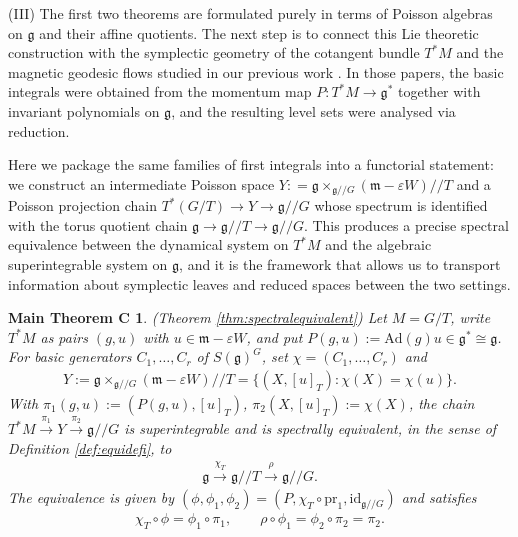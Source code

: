 \documentclass[11pt,reqno]{amsart}
\newtheorem*{theorem A}{Main Theorem A}
\newtheorem*{theorem B}{Main Theorem B}
\newtheorem*{theorem C}{Main Theorem C}
\newtheorem*{theorem D}{Main Theorem D}
\theoremstyle{definition}
\theoremstyle{plain}
\theoremstyle{conclusion}
\begin{document}
(III) The first two theorems are formulated purely in terms of Poisson algebras on $\mathfrak{g}$ and their affine quotients. The next step is to connect this Lie theoretic construction with the symplectic geometry of the cotangent bundle $T^*M$ and the magnetic geodesic flows studied in our previous work \cite{jiang2026poisson,campoamor2026construction}. In those papers, the basic integrals were obtained from the momentum map $P\colon T^*M\to\mathfrak{g}^*$ together with invariant polynomials on $\mathfrak{g}$, and the resulting level sets were analysed via reduction.

Here we package the same families of first integrals into a functorial statement: we construct an intermediate Poisson space $Y : = \mathfrak{g} \times_{\mathfrak{g}//G} (\mathfrak{m}-\varepsilon W)// T$ and a Poisson projection chain $T^*(G/T)\to Y\to\mathfrak{g}//G$ whose spectrum is identified with the torus quotient chain $\mathfrak{g}\to\mathfrak{g}//T\to\mathfrak{g}//G$. This produces a precise spectral equivalence between the dynamical system on $T^*M$ and the algebraic superintegrable system on $\mathfrak{g}$, and it is the framework that allows us to transport information about symplectic leaves and reduced spaces between the two settings.


\begin{theorem C}
 (Theorem \ref{thm:spectralequivalent})
Let $M=G/T$, write $T^*M$ as pairs $(g,u)$ with $u\in\mathfrak{m}-\varepsilon W$, and put $P(g,u):=\mathrm{Ad}(g)u\in\mathfrak{g}^*\cong\mathfrak{g}$. For basic generators $C_1,\ldots,C_r$ of $S(\mathfrak{g})^G$, set $\chi=(C_1,\ldots,C_r)$ and \begin{align*}
Y:=\mathfrak{g}\times_{\mathfrak{g}//G}(\mathfrak{m}-\varepsilon W)//T =\bigl\{(X,[u]_T):\chi(X)=\chi(u)\bigr\}.
\end{align*} With $\pi_1(g,u):=(P(g,u),[u]_T)$, $\pi_2(X,[u]_T):=\chi(X)$, the chain $T^*M\xrightarrow{\pi_1}Y\xrightarrow{\pi_2}\mathfrak{g}//G$ is superintegrable and is spectrally equivalent, in the sense of Definition \ref{def:equidefi}, to \begin{align*}
\mathfrak{g}\xrightarrow{\chi_T}\mathfrak{g}//T\xrightarrow{\rho}\mathfrak{g}//G.
\end{align*} The equivalence is given by $(\phi,\phi_1,\phi_2)=(P,\chi_T\circ\mathrm{pr}_1,\mathrm{id}_{\mathfrak{g}//G})$ and satisfies \begin{align*}
   \chi_T\circ\phi=\phi_1\circ\pi_1,\qquad \rho \circ\phi_1=\phi_2\circ\pi_2=\pi_2.  
\end{align*}
\end{theorem C}
\end{document}
